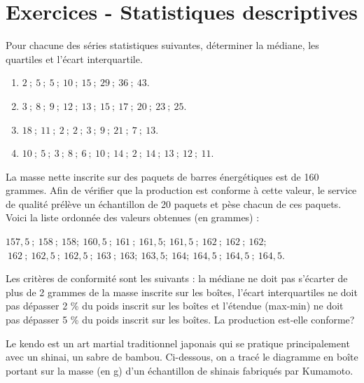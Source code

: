 \section*{Exercices - Statistiques descriptives}
{\setlength{\columnseprule}{0pt}
\setcounter{NumEx}{1}



\begin{Exercice}%
Pour chacune des séries statistiques suivantes, déterminer la médiane, les quartiles et l'écart interquartile.
\begin{enumerate}
\item $ 2~ ; ~5~ ; ~5~ ; ~10~ ; ~15~ ; ~29~ ; ~36~ ; ~43. $
\item $ 3~ ; ~8~ ; ~9~ ; ~12~ ; ~13~ ; ~15~ ; ~17~ ; ~20~ ; ~23~ ; ~25. $
\item $ 18~ ; ~11~ ; ~2~ ; ~2~ ; ~3~ ; ~9~ ; ~21~ ; ~7~ ; ~13. $
\item $ 10~ ; ~5~ ; ~3~ ; ~8~ ; ~6~ ; ~10~ ; ~14~ ; ~2~ ; ~14~ ; ~13~ ; ~12~ ; ~11. $
\end{enumerate}
\end{Exercice}


\begin{Exercice}%
La masse nette inscrite sur des paquets de barres énergétiques est de 160 grammes.
Afin de vérifier que la production est conforme à cette valeur, le service de qualité prélève un échantillon de 20 paquets et pèse chacun de ces paquets.
Voici la liste ordonnée des valeurs obtenues (en grammes) :

\begin{center}
$ 157,5~ ; ~158~ ; ~158;~ 160,5~ ; ~161~ ; ~161,5;~161,5~ ; ~162~ ; ~162~ ; ~162;$ \\
$~162~ ; ~162,5~ ; ~162,5~ ; ~163~ ; ~163;~163,5;~164;~164,5~ ; ~164,5~ ; ~164,5. $
\end{center}

Les critères de conformité sont les suivants : la médiane ne doit pas s'écarter de plus de 2 grammes de la masse inscrite sur les boîtes, l'écart interquartiles ne doit pas dépasser 2 \% du poids inscrit sur les boîtes et l'étendue (max-min) ne doit pas dépasser 5 \% du poids inscrit sur les boîtes. La production est-elle conforme?
\end{Exercice}


\begin{Exercice}%
Le kendo est un art martial traditionnel japonais qui se pratique principalement avec un shinai, un sabre de bambou.
Ci-dessous, on a tracé le diagramme en boîte portant sur la masse (en g) d'un échantillon de shinais fabriqués par Kumamoto.


\end{Exercice}}
